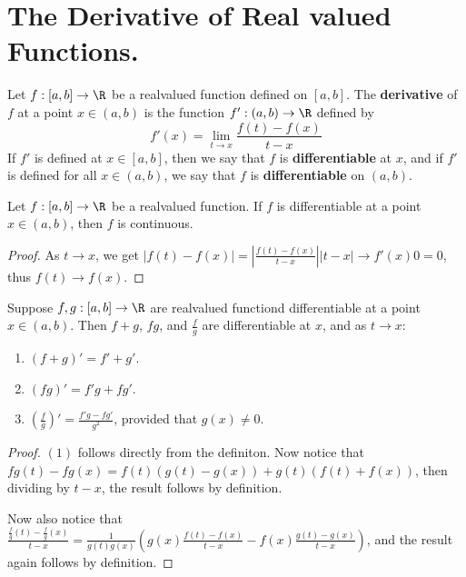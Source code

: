 
\section{The Derivative of Real valued Functions.}

\begin{definition}
    Let $f:[a,b] \rightarrow \R$ be a realvalued function defined on  $[a,b]$. The \textbf{derivative} 
    of $f$ at a point  $x \in (a,b)$ is the function $f':(a,b) \rightarrow \R$ defined by
        \begin{equation}
            f'(x)=\lim_{t \rightarrow x}{\frac{f(t)-f(x)}{t-x}}
        \end{equation}
        If $f'$ is defined at $x \in [a,b]$, then we say that $f$ is \textbf{differentiable} at $x$,
        and if $f'$ is  defined for all $x \in (a,b)$, we say that $f$ is \textbf{differentiable} 
        on $(a,b)$.
\end{definition}

\begin{theorem}\label{6.1.1}
    Let $f:[a,b] \rightarrow \R$ be a realvalued function. If  $f$ is differentiable at a point 
    $x \in (a,b)$, then $f$ is continuous.
\end{theorem}
\begin{proof}
    As $t \rightarrow x$, we get $|f(t)-f(x)|=|\frac{f(t)-f(x)}{t-x}||t-x| \rightarrow f'(x)0=0$, 
    thus $f(t) \rightarrow f(x)$.
\end{proof}

\begin{theorem}\label{6.1.2}
    Suppose $f,g:[a,b] \rightarrow  \R$ are realvalued functiond differentiable at a point 
    $x \in (a,b)$. Then $f+g$,  $fg$, and  $ \frac{f}{g}$ are differentiable at $x$, and 
    as $t \rightarrow x$:
        \begin{enumerate}[label=(\arabic*)]
            \item $(f+g)'=f'+g'$.

            \item $(fg)'=f'g+fg'$.

            \item  $(\frac{f}{g})'=\frac{f'g-fg'}{g^2}$, provided that $g(x) \neq 0$.
        \end{enumerate}
\end{theorem}
\begin{proof}
    $(1)$ follows directly from the definiton. Now notice that $fg(t)-fg(x)=f(t)(g(t)-g(x))+
    g(t)(f(t)+f(x))$, then dividing by  $t-x$, the result follows by definition.

    Now also notice that $ \frac{\frac{f}{g}(t)-\frac{f}{g}(x)}{t-x}=\frac{1}{g(t)g(x)}
    (g(x)\frac{f(t)-f(x)}{t-x}-f(x)\frac{g(t)-g(x)}{t-x})$, and the result again follows by 
    definition.
\end{proof}

